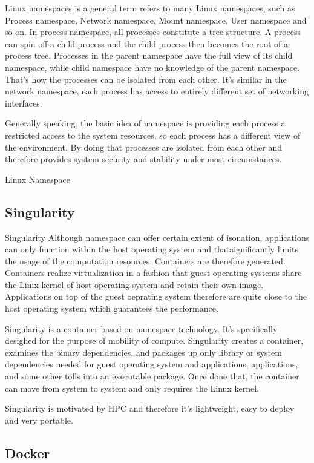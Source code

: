 \documentclass{article}
\begin{document}
	Linux namespaces is a general term refers to many Linux namespaces, such as Process namespace, Network namespace, Mount namespace, User namespace and so on. In process namespace, all processes constitute a tree structure. A process can spin off a child process and the child process then becomes the root of a process tree. Processes in the parent namespace have the full view of its child namespace, while child namespace have no knowledge of the parent namespace. That's how the processes can be isolated from each other. It's similar in the network namespace, each process has access to entirely different set of networking interfaces. 

	Generally speaking, the basic idea of namespace is providing each process a restricted access to the system resources, so each process has a different view of the environment. By doing that processes are isolated from each other and therefore provides system security and stability under most circumstances. 

Linux Namespace\cite{rosen2013resource}

\subsection{Singularity}

Singularity\cite{singularity} Although namespace can offer certain extent of isonation, applications can only function within the host operating system and thataignificantly limits the usage of the computation resources. Containers are therefore generated. Containers realize virtualization in a fashion that guest operating systems share the Linix kernel of host operating system and retain their own image. Applications on top of the guest oeprating system therefore are quite close to the host operating system which guarantees the performance. 

Singularity is a container based on namespace technology. It's specifically desighed for the purpose of mobility of compute. Singularity creates a container, examines the binary dependencies, and packages up only library or system dependencies needed for guest operating system and applications, applications, and some other tolls into an executable package. Once done that, the container can move from system to system and only requires the Linux kernel.

Singularity is motivated by HPC and therefore it's lightweight, easy to deploy and very portable. 

\subsection{Docker}
\end{document}
